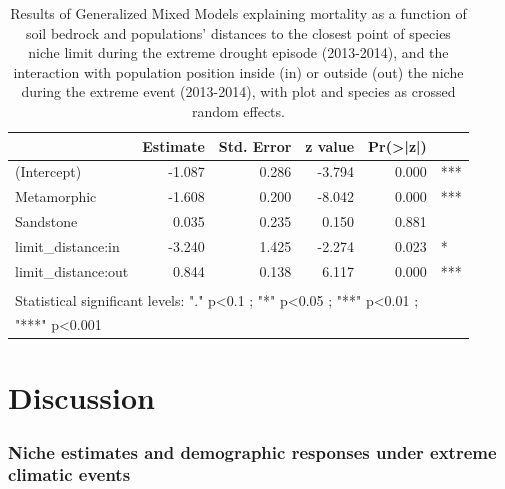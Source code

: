 \documentclass[11pt,twoside]{reedthesis}
\begin{document}
\begin{table}[H]

\caption[Model result of  mortality as a function of soil bedrock and populations’ distances to the closest point of species niche limit]{\label{tab:unnamed-chunk-8}Results of Generalized Mixed Models explaining mortality as a function of soil bedrock and populations’ distances to the closest point of species niche limit during the extreme drought episode (2013-2014), and the interaction with population position inside (in) or outside (out) the niche during the extreme event (2013-2014), with plot and species as crossed random effects.}
\centering
\fontsize{8}{10}\selectfont
\begin{tabular}[t]{lrrrrl}
\toprule
 & Estimate & Std. Error & z value & Pr(>|z|) & \\
\midrule
(Intercept) & -1.087 & 0.286 & -3.794 & 0.000 & ***\\
Metamorphic & -1.608 & 0.200 & -8.042 & 0.000 & ***\\
Sandstone & 0.035 & 0.235 & 0.150 & 0.881 & \\
limit\_distance:in & -3.240 & 1.425 & -2.274 & 0.023 & *\\
limit\_distance:out & 0.844 & 0.138 & 6.117 & 0.000 & ***\\
\bottomrule
\multicolumn{6}{l}{\textsuperscript{} Statistical significant levels: "." p<0.1 ; "*" p<0.05 ; "**" p<0.01 ;}\\
\multicolumn{6}{l}{"***" p<0.001}\\
\end{tabular}
\end{table}
\section{Discussion}\label{discussion-2}

\subsubsection{Niche estimates and demographic responses under extreme
climatic
events}\label{niche-estimates-and-demographic-responses-under-extreme-climatic-events}
\end{document}

